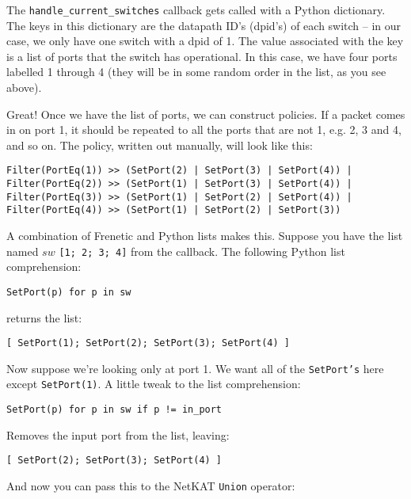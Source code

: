 The \texttt{handle\_current\_switches} callback gets called with a Python dictionary.  
The keys in this dictionary are the datapath ID's (dpid's) of each switch -- in our case, we only have
one switch with a dpid of 1.
The value associated with the key is a list of ports that the switch has operational.  
In this case, we have four ports labelled 1 through 4 (they will be in some random order in the list, as
you see above).

Great!  Once we have the list of ports, we can construct policies.  If a packet comes in on port
1, it should be repeated to all the ports that are not 1, e.g. 2, 3 and 4, and so on.   
The policy, written out manually, will look like this:

\begin{verbatim}
Filter(PortEq(1)) >> (SetPort(2) | SetPort(3) | SetPort(4)) |
Filter(PortEq(2)) >> (SetPort(1) | SetPort(3) | SetPort(4)) |
Filter(PortEq(3)) >> (SetPort(1) | SetPort(2) | SetPort(4)) |
Filter(PortEq(4)) >> (SetPort(1) | SetPort(2) | SetPort(3))
\end{verbatim}

A combination of Frenetic and Python lists makes this.  Suppose you have the list named $sw$
\texttt{[1; 2; 3; 4]} from the callback.   The following Python list comprehension:

\begin{verbatim}
SetPort(p) for p in sw
\end{verbatim}

returns the list:

\begin{verbatim}
[ SetPort(1); SetPort(2); SetPort(3); SetPort(4) ]
\end{verbatim}

Now suppose we're looking only at port 1.  We want all of the \texttt{SetPort's} here 
except \texttt{SetPort(1)}.  A little tweak to the list comprehension:

\begin{verbatim}
SetPort(p) for p in sw if p != in_port
\end{verbatim}

Removes the input port from the list, leaving:

\begin{verbatim}
[ SetPort(2); SetPort(3); SetPort(4) ]
\end{verbatim}

And now you can pass this to the NetKAT \texttt{Union} operator:

